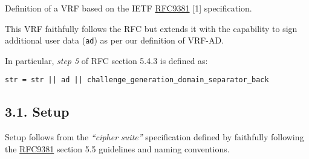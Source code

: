 \documentclass[
]{article}
\begin{document}
Definition of a VRF based on the IETF
\href{https://datatracker.ietf.org/doc/rfc9381}{RFC9381} {[}1{]}
specification.

This VRF faithfully follows the RFC but extends it with the capability
to sign additional user data (\texttt{ad}) as per our definition of
VRF-AD.

In particular, \emph{step 5} of RFC section 5.4.3 is defined as:

\begin{verbatim}
str = str || ad || challenge_generation_domain_separator_back
\end{verbatim}

\hypertarget{setup}{%
\subsection{3.1. Setup}\label{setup}}

Setup follows from the \emph{``cipher suite''} specification defined by
faithfully following the
\href{https://datatracker.ietf.org/doc/rfc9381}{RFC9381} section 5.5
guidelines and naming conventions.
\end{document}
